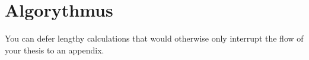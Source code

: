 \chapter{Algorythmus}

You can defer lengthy calculations that would otherwise only interrupt
the flow of your thesis to an appendix.
